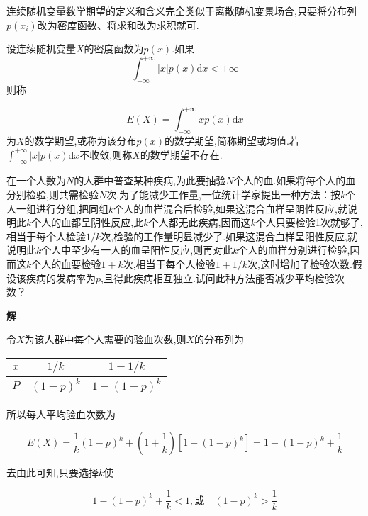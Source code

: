 连续随机变量数学期望的定义和含义完全类似于离散随机变景场合,只要将分布列$ p(x_i) $改为密度函数、将求和改为求积就可.

\begin{definition}{}{}
	设连续随机变量$ X $的密度函数为$ p(x) $.如果
	\[ 
	\int_{-\infty}^{+\infty}|x| p(x) \mathrm{d} x<+\infty
	\]
	则称
	
	\begin{equation} 
	E(X)=\int_{-\infty}^{+\infty} x p(x) \mathrm{d} x \label{eq:2.2.2}
	\end{equation}
	为$ X $的数学期望,或称为该分布$ p(x) $的数学期望,简称期望或均值.若$\int_{-\infty}^{+\infty}|x| p(x) \mathrm{d} x$不收敛,则称$ X $的数学期望不存在.
	
\end{definition}

\begin{example}
	在一个人数为$ N $的人群中普查某种疾病,为此要抽验$ N $个人的血.如果将每个人的血分别检验,则共需检验$ N $次.为了能减少工作量,一位统计学家提出一种方法：按$ k $个人一组进行分组,把同组$ k $个人的血样混合后检验,如果这混合血样呈阴性反应,就说明此$ k $个人的血都呈阴性反应,此$ k $个人都无此疾病,因而这$ k $个人只要检验1次就够了,相当于每个人检验$ 1/k $次,检验的工作量明显减少了.如果这混合血样呈阳性反应,就说明此$ k $个人中至少有一人的血呈阳性反应,则再对此$ k $个人的血样分别进行检验,因而这$ k $个人的血要检验$ 1+k $次,相当于每个人检验$ 1+1/k $次,这时增加了检验次数.假设该疾病的发病率为$ p $,且得此疾病相互独立.试问此种方法能否减少平均检验次数？
	
	\textbf{解}
	
	令$ X $为该人群中每个人需要的验血次数,则$ X $的分布列为
	
	\begin{table}[htbp]
		\centering
		\begin{tabular}{c|cc}
			$ x $	&    $ 1 / k $      &  $ 1+1 / k $ \\\midrule
			$ P $	&    $ (1-p)^{k} $  &  $ 1-(1-p)^{k} $\\
		\end{tabular}%
	\end{table}%
	
\end{example}

所以每人平均验血次数为

\[ 
E(X)=\frac{1}{k}(1-p)^{k}+\left(1+\frac{1}{k}\right)\left[1-(1-p)^{k}\right]=1-(1-p)^{k}+\frac{1}{k}
\]

去由此可知,只要选择$ k $使

\[ 
1-(1-p)^{k}+\frac{1}{k}<1, \text{或} \quad(1-p)^{k}>\frac{1}{k}
\]

